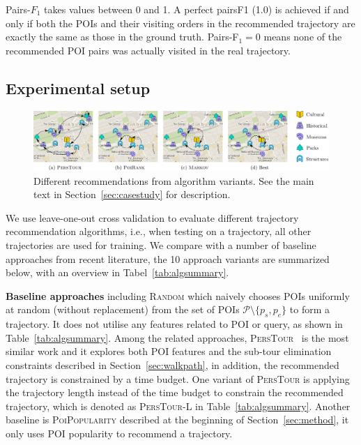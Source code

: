 Pairs-$F_1$ takes values between 0 and 1. A perfect pairsF1 (1.0) is achieved if and only if 
both the POIs and their visiting orders in the
recommended trajectory are exactly the same as those in the ground truth. 
Pairs-F$_1 = 0$ means none of the recommended POI pairs was actually visited in the real trajectory.


\subsection{Experimental setup}
\label{sec:setup}
\secmoveup





\begin{figure}[t]
	\centering
	\includegraphics[width=\textwidth]{fig/example-tour.pdf}
	\caption{Different recommendations from algorithm variants. 
    See the main text in Section~\ref{sec:casestudy} for description.}
	\label{fig:exampleresult}
	\captionmoveup
\end{figure}

We use leave-one-out cross validation to evaluate different trajectory recommendation algorithms,
i.e., when testing on a trajectory, all other trajectories are used for training. 
We compare with a number of baseline approaches from recent literature, the 10 approach variants 
are summarized below, with an overview in Tabel~\ref{tab:algsummary}.

{\bf Baseline approaches} including \textsc{Random} which naively chooses POIs uniformly at random
(without replacement) from the set of POIs $\mathcal{P} \setminus \{p_s, p_e \}$ to form a trajectory.
It does not utilise any features related to POI or query, as shown in Table~\ref{tab:algsummary}.
Among the related approaches, \textsc{PersTour}~\cite{ijcai15} is the most similar work and it
explores both POI features and the sub-tour elimination constraints described in Section~\ref{sec:walkpath},
in addition, the recommended trajectory is constrained by a time budget.
One variant of \textsc{PersTour} is applying the trajectory length instead of the time budget to constrain
the recommended trajectory, which is denoted as \textsc{PersTour-L} in Table~\ref{tab:algsummary}.
Another baseline is \textsc{PoiPopularity} described at the beginning of Section~\ref{sec:method},
it only uses POI popularity to recommend a trajectory.

